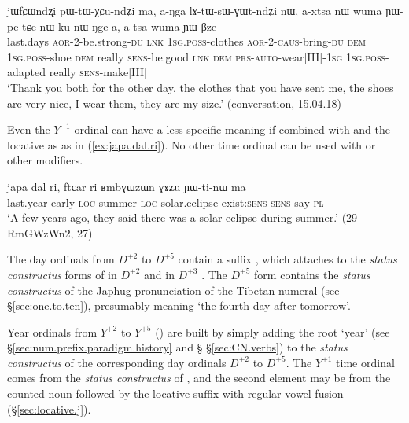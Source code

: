 \begin{exe}
\ex \label{ex:jWfCWndzxi}
\gll jɯfɕɯndʐi pɯ-tɯ-χɕu-ndʑi ma, a-ŋga lɤ-tɯ-sɯ-ɣɯt-ndʑi nɯ, a-xtsa nɯ wuma ɲɯ-pe tɕe nɯ ku-nɯ-ŋge-a,  a-tsa wuma ɲɯ-βze \\ 
last.days \textsc{aor}-2-be.strong-\textsc{du} \textsc{lnk} \textsc{1sg}.\textsc{poss}-clothes \textsc{aor}-2-\textsc{caus}-bring-\textsc{du} \textsc{dem} \textsc{1sg}.\textsc{poss}-shoe \textsc{dem} really \textsc{sens}-be.good \textsc{lnk} \textsc{dem} \textsc{prs}-\textsc{auto}-wear[III]-\textsc{1sg}  \textsc{1sg}.\textsc{poss}-adapted really \textsc{sens}-make[III] \\
\glt `Thank you both for the other day, the clothes that you have sent me, the shoes are very nice, I wear them, they are my size.' (conversation, 15.04.18)
\end{exe}

Even the $Y^{-1}$ ordinal  can have a less specific meaning if combined with  and the locative  as  as in (\ref{ex:japa.dal.ri}). No other time ordinal can be used with  or other modifiers.

\begin{exe}
\ex \label{ex:japa.dal.ri}
\gll japa dal ri, ftɕar ri  ʁmbɣɯzɯn ɣɤʑu ɲɯ-ti-nɯ ma \\
 last.year early \textsc{loc} summer \textsc{loc} solar.eclipse exist:\textsc{sens} \textsc{sens}-say-\textsc{pl} \\
\glt `A few years ago, they said there was a solar eclipse during summer.' (29-RmGWzWn2, 27)
\end{exe}

The day ordinals from $D^{+2}$ to $D^{+5}$ contain a suffix , which attaches to the \textit{status constructus} forms of  in $D^{+2}$  and  in $D^{+3}$ . The $D^{+5}$ form  contains the \textit{status constructus}  of the Japhug pronunciation  of the Tibetan numeral   (see §\ref{sec:one.to.ten}), presumably meaning `the fourth day after tomorrow'.

Year ordinals from $Y^{+2}$ to $Y^{+5}$ () are built by simply adding the root  `year' (see §\ref{sec:num.prefix.paradigm.history} and § §\ref{sec:CN.verbs}) to the \textit{status constructus} of the corresponding day ordinals $D^{+2}$ to $D^{+5}$. The $Y^{+1}$ time ordinal  comes from the \textit{status constructus} of  , and the second element may be from the counted noun  followed by the locative suffix  with regular vowel fusion (§\ref{sec:locative.j}).

